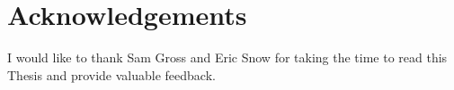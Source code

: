 \chapter*{Acknowledgements}
\label{ch:acknoledgements}


I would like to thank Sam Gross and Eric Snow for taking the time to read this Thesis and provide valuable feedback.
